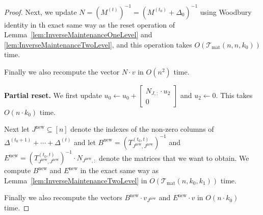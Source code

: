 \documentclass[11pt]{article}
\newcommand{\Tmat}{\mathcal{T}_{\mathrm{mat}}}
\newcommand{\new}{\mathrm{new}}
\newcommand\uu{\boldsymbol{\mathit{u}}}
\newcommand\vv{\boldsymbol{\mathit{v}}}
\newcommand\BB{\boldsymbol{\mathit{B}}}
\newcommand\EE{\boldsymbol{\mathit{E}}}
\newcommand\NN{\boldsymbol{\mathit{N}}}
\newcommand\MM{\boldsymbol{\mathit{M}}}
\newcommand\TT{\boldsymbol{\mathit{T}}}
\begin{document}
\begin{proof}
Next, we update $\NN = (\MM^{(t)})^{-1} = (\MM^{(t_0)} + \Delta_0)^{-1}$ using Woodbury identity in th exact same way as the reset operation of Lemma~\ref{lem:InverseMaintenanceOneLevel} and \ref{lem:InverseMaintenanceTwoLevel}, and this operation takes $O(\Tmat(n,n,k_0))$ time. 

Finally we also recompute the vector $\NN \cdot \vv$ in $O(n^2)$ time.

{\bf Partial reset.} We first update $\uu_0 \gets \uu_0 + \begin{bmatrix}
\NN_{J,:} \cdot \uu_2 \\ 0
\end{bmatrix}$ and $\uu_2 \gets 0$. This takes $O(n \cdot k_0)$ time. 

Next let $J^{\new} \subseteq [n]$ denote the indexes of the non-zero columns of $\Delta^{(t_0+1)} + \cdots + \Delta^{(t)}$ and let $\BB^{\new} = (\TT^{(t_0,t)}_{J^{\new},J^{\new}})^{-1}$ and $\EE^{\new} = (\TT^{(t_0,t)}_{J^{\new},J^{\new}})^{-1} \cdot \NN_{J^{\new},:}$ denote the matrices that we want to obtain. We compute $\BB^{\new}$ and $\EE^{\new}$ in the exact same way as Lemma~\ref{lem:InverseMaintenanceTwoLevel} in $O(\Tmat(n, k_0, k_1))$ time. 

Finally we also recompute the vectors $\BB^{\new} \cdot \vv_{J^{\new}}$ and $\EE^{\new} \cdot \vv$ in $O(n \cdot k_0)$ time.



\end{proof}
\end{document}
